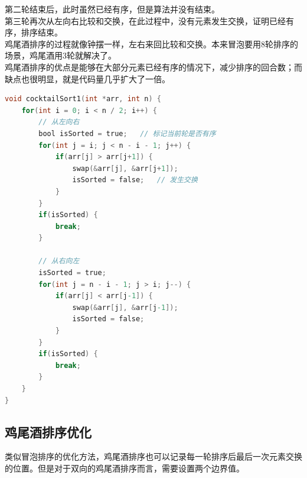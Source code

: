 第二轮结束后，此时虽然已经有序，但是算法并没有结束。\\

第三轮再次从左向右比较和交换，在此过程中，没有元素发生交换，证明已经有序，排序结束。\\

鸡尾酒排序的过程就像钟摆一样，左右来回比较和交换。本来冒泡要用8轮排序的场景，鸡尾酒用3轮就解决了。\\

鸡尾酒排序的优点是能够在大部分元素已经有序的情况下，减少排序的回合数；而缺点也很明显，就是代码量几乎扩大了一倍。\\


\begin{lstlisting}[language=C]
void cocktailSort1(int *arr, int n) {
    for(int i = 0; i < n / 2; i++) {
        // 从左向右
        bool isSorted = true;   // 标记当前轮是否有序
        for(int j = i; j < n - i - 1; j++) {
            if(arr[j] > arr[j+1]) {
                swap(&arr[j], &arr[j+1]);
                isSorted = false;   // 发生交换
            }
        }
        if(isSorted) {
            break;
        }

        // 从右向左
        isSorted = true;
        for(int j = n - i - 1; j > i; j--) {
            if(arr[j] < arr[j-1]) {
                swap(&arr[j], &arr[j-1]);
                isSorted = false;
            }
        }
        if(isSorted) {
            break;
        }
    }
}
\end{lstlisting}

\vspace{0.5cm}

\subsection{鸡尾酒排序优化}

类似冒泡排序的优化方法，鸡尾酒排序也可以记录每一轮排序后最后一次元素交换的位置。但是对于双向的鸡尾酒排序而言，需要设置两个边界值。\\


